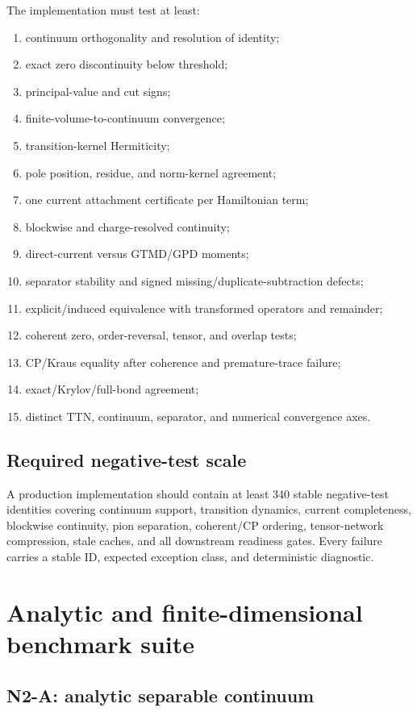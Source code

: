 \documentclass[11pt]{article}
\begin{document}
The implementation must test at least:
\begin{enumerate}
\item continuum orthogonality and resolution of identity;
\item exact zero discontinuity below threshold;
\item principal-value and cut signs;
\item finite-volume-to-continuum convergence;
\item transition-kernel Hermiticity;
\item pole position, residue, and norm-kernel agreement;
\item one current attachment certificate per Hamiltonian term;
\item blockwise and charge-resolved continuity;
\item direct-current versus GTMD/GPD moments;
\item separator stability and signed missing/duplicate-subtraction defects;
\item explicit/induced equivalence with transformed operators and remainder;
\item coherent zero, order-reversal, tensor, and overlap tests;
\item CP/Kraus equality after coherence and premature-trace failure;
\item exact/Krylov/full-bond agreement;
\item distinct TTN, continuum, separator, and numerical convergence axes.
\end{enumerate}

\subsection{Required negative-test scale}

A production implementation should contain at least 340 stable negative-test
identities covering continuum support, transition dynamics, current
completeness, blockwise continuity, pion separation, coherent/CP ordering,
tensor-network compression, stale caches, and all downstream readiness gates.
Every failure carries a stable ID, expected exception class, and deterministic
diagnostic.

\section{Analytic and finite-dimensional benchmark suite}
\label{sec:benchmarks}

\subsection{N2-A: analytic separable continuum}
\end{document}
